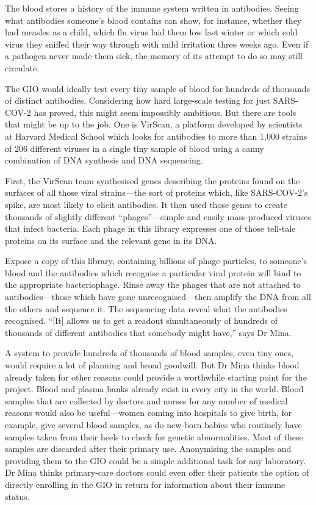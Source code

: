 \documentclass{article}
\begin{document}
The blood stores a history of the immune system written in antibodies. Seeing what antibodies someone's blood contains can show, for instance, whether they had measles as a child, which flu virus laid them low last winter or which cold virus they sniffed their way through with mild irritation three weeks ago. Even if a pathogen never made them sick, the memory of its attempt to do so may still circulate. 

The GIO would ideally test every tiny sample of blood for hundreds of thousands of distinct antibodies. Considering how hard large-scale testing for just SARS-COV-2 has proved, this might seem impossibly ambitious. But there are tools that might be up to the job. One is VirScan, a platform developed by scientists at Harvard Medical School which looks for antibodies to more than 1,000 strains of 206 different viruses in a single tiny sample of blood using a canny combination of DNA synthesis and DNA sequencing. 

First, the VirScan team synthesised genes describing the proteins found on the surfaces of all those viral strains---the sort of proteins which, like SARS-COV-2's spike, are most likely to elicit antibodies. It then used those genes to create thousands of slightly different ``phages''---simple and easily mass-produced viruses that infect bacteria. Each phage in this library expresses one of those tell-tale proteins on its surface and the relevant gene in its DNA. 

Expose a copy of this library, containing billions of phage particles, to someone's blood and the antibodies which recognise a particular viral protein will bind to the appropriate bacteriophage. Rinse away the phages that are not attached to antibodies---those which have gone unrecognised---then amplify the DNA from all the others and sequence it. The sequencing data reveal what the antibodies recognised. ``{[}It{]} allows us to get a readout simultaneously of hundreds of thousands of different antibodies that somebody might have,'' says Dr Mina. 

A system to provide hundreds of thousands of blood samples, even tiny ones, would require a lot of planning and broad goodwill. But Dr Mina thinks blood already taken for other reasons could provide a worthwhile starting point for the project. Blood and plasma banks already exist in every city in the world. Blood samples that are collected by doctors and nurses for any number of medical reasons would also be useful---women coming into hospitals to give birth, for example, give several blood samples, as do new-born babies who routinely have samples taken from their heels to check for genetic abnormalities. Most of these samples are discarded after their primary use. Anonymising the samples and providing them to the GIO could be a simple additional task for any laboratory. Dr Mina thinks primary-care doctors could even offer their patients the option of directly enrolling in the GIO in return for information about their immune status. 
\end{document}
